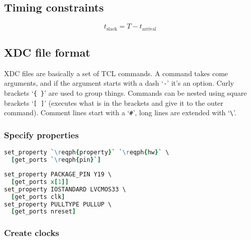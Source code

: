 \documentclass[margin=small]{tex/hsrzf}
\begin{document}
\subsection{Timing constraints}


\[
  t_\text{slack} = T - t_\text{arrival}
\]

\subsection{XDC file format}

XDC files are basically a set of TCL commands. A command takes come arguments, and if the argument starts with a dash `\texttt{-}' it's an option. Curly brackets `\texttt{\{ \}}' are used to group things. Commands can be nested using square brackets `\texttt{[ ]}' (executes what is in the brackets and give it to the outer command). Comment lines start with a `\texttt{\#}', long lines are extended with `\texttt{\textbackslash}'.

\subsubsection{Specify properties}

\begin{lstlisting}[language = tcl]
set_property `\reqph{property}` `\reqph{hw}` \
  [get_ports `\reqph{pin}`]
\end{lstlisting}
\begin{lstlisting}[language = tcl]
set_property PACKAGE_PIN Y19 \
  [get_ports x[1]]
set_property IOSTANDARD LVCMOS33 \
  [get_ports clk]
set_property PULLTYPE PULLUP \
  [get_ports nreset]
\end{lstlisting}

\subsubsection{Create clocks}
\end{document}
